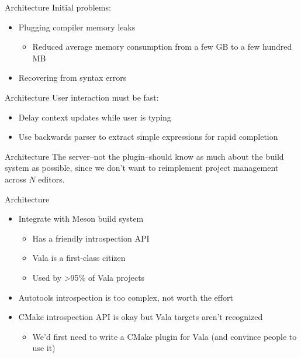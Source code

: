 \documentclass[t]{beamer}
\begin{document}
\begin{frame}[c]{Architecture}    
    Initial problems:
    \begin{itemize}
        \item Plugging compiler memory leaks
        \begin{itemize}
            \item Reduced average memory consumption from a few GB to a few hundred MB
        \end{itemize}
        \item Recovering from syntax errors
    \end{itemize}
\end{frame}

\begin{frame}[c]{Architecture}
    User interaction must be fast:
    \begin{itemize}
        \item Delay context updates while user is typing
        \item Use backwards parser to extract simple expressions for rapid completion
    \end{itemize}
\end{frame}

\begin{frame}[c]{Architecture}
    The server--not the plugin--should know as much about the build system as possible, since we don't want to reimplement project management across $N$ editors.
\end{frame}

\begin{frame}[c]{Architecture}
    \begin{itemize}
        \item Integrate with Meson build system
            \begin{itemize}
                \item Has a friendly introspection API
                \item Vala is a first-class citizen
                \item Used by >95\% of Vala projects
            \end{itemize}
        \item Autotools introspection is too complex, not worth the effort
        \item CMake introspection API is okay but Vala targets aren't recognized
        \begin{itemize}
            \item We'd first need to write a CMake plugin for Vala (and convince people to use it)
        \end{itemize}
    \end{itemize}
\end{frame}
\end{document}
